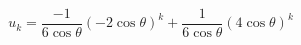 \begin{displaymath}
 u_k = \frac{-1}{6\cos\theta}(-2\cos \theta)^k + \frac{1}{6\cos\theta}(4\cos \theta)^k
\end{displaymath}